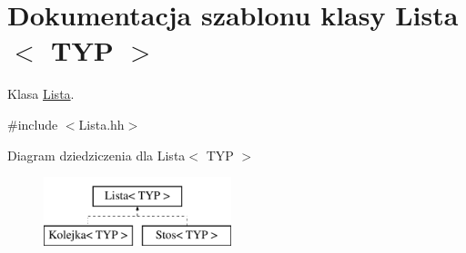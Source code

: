 \hypertarget{class_lista}{\section{Dokumentacja szablonu klasy Lista$<$ T\-Y\-P $>$}
\label{class_lista}
}


Klasa \hyperlink{class_lista}{Lista}.  




{\ttfamily \#include $<$Lista.\-hh$>$}

Diagram dziedziczenia dla Lista$<$ T\-Y\-P $>$\begin{figure}[H]
\begin{center}
\leavevmode
\includegraphics[height=2.000000cm]{class_lista}
\end{center}
\end{figure}
